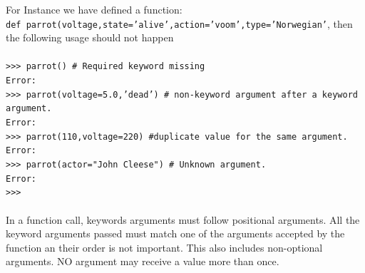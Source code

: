 \documentclass[12pt,a4paper]{article}
\begin{document}
For Instance we have defined a function: \\ \texttt{def parrot(voltage,state='alive',action='voom',type='Norwegian'}, then the following usage should not happen\\
\texttt{\\
>>> parrot() \# Required keyword missing\\
Error:\\
>>> parrot(voltage=5.0,'dead') \# non-keyword argument after a keyword argument.\\
Error:\\
>>> parrot(110,voltage=220) \#duplicate value for the same argument.\\
Error:\\
>>> parrot(actor="John Cleese") \# Unknown argument.\\
Error:\\
>>> \\
\\
}
In a function call, keywords arguments must follow positional arguments. All the keyword  arguments passed must match one of the arguments accepted by the function an their order is not important. This also includes non-optional arguments. NO argument may receive a value more than once. 
\end{document}
